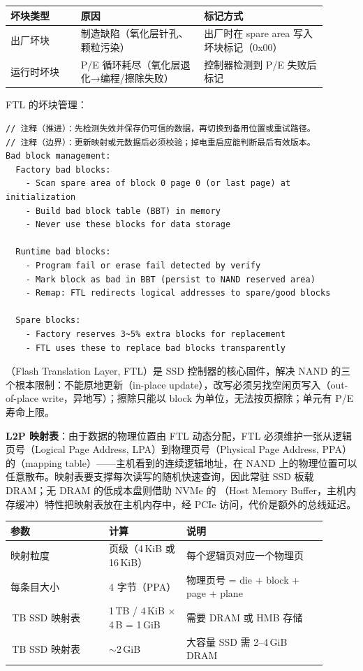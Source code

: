 \begin{longtable}{L{0.2\linewidth}L{0.35\linewidth}L{0.35\linewidth}}
\toprule
坏块类型 & 原因 & 标记方式 \\
\midrule
出厂坏块 & 制造缺陷（氧化层针孔、颗粒污染） & 出厂时在 spare area 写入坏块标记（0x00） \\\tablerowrule
运行时坏块 & P/E 循环耗尽（氧化层退化→编程/擦除失败） & 控制器检测到 P/E 失败后标记 \\
\bottomrule
\end{longtable}

FTL 的坏块管理：
\begin{lstlisting}
// 注释（推进）：先检测失效并保存仍可信的数据，再切换到备用位置或重试路径。
// 注释（边界）：更新映射或元数据后必须校验；掉电重启应能判断最后有效版本。
Bad block management:
  Factory bad blocks:
    - Scan spare area of block 0 page 0 (or last page) at initialization
    - Build bad block table (BBT) in memory
    - Never use these blocks for data storage

  Runtime bad blocks:
    - Program fail or erase fail detected by verify
    - Mark block as bad in BBT (persist to NAND reserved area)
    - Remap: FTL redirects logical addresses to spare/good blocks

  Spare blocks:
    - Factory reserves 3~5% extra blocks for replacement
    - FTL uses these to replace bad blocks transparently
\end{lstlisting}


（Flash Translation Layer, FTL）是 SSD 控制器的核心固件，解决 NAND 的三个根本限制：不能原地更新（in-place update），改写必须另找空闲页写入（out-of-place write，异地写）；擦除只能以 block 为单位，无法按页擦除；单元有 P/E 寿命上限。

\textbf{L2P 映射表}：由于数据的物理位置由 FTL 动态分配，FTL 必须维护一张从逻辑页号（Logical Page Address, LPA）到物理页号（Physical Page Address, PPA）的（mapping table）——主机看到的连续逻辑地址，在 NAND 上的物理位置可以任意散布。映射表要支撑每次读写的随机快速查询，因此常驻 SSD 板载 DRAM；无 DRAM 的低成本盘则借助 NVMe 的 （Host Memory Buffer，主机内存缓冲）特性把映射表放在主机内存中，经 PCIe 访问，代价是额外的总线延迟。

\begin{longtable}{L{0.28\linewidth}L{0.22\linewidth}L{0.4\linewidth}}
\toprule
参数 & 计算 & 说明 \\
\midrule
映射粒度 & 页级（4\,KiB 或 16\,KiB） & 每个逻辑页对应一个物理页 \\\tablerowrule
每条目大小 & 4 字节（PPA） & 物理页号 = die + block + page + plane \\\,TB SSD 映射表 & 1\,TB / 4\,KiB $\times$ 4\,B = 1\,GiB & 需要 DRAM 或 HMB 存储 \\\,TB SSD 映射表 & $\sim$2\,GiB & 大容量 SSD 需 2--4\,GiB DRAM \\
\bottomrule
\end{longtable}

